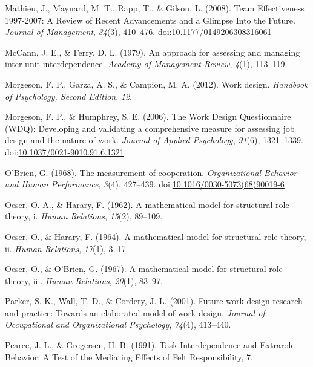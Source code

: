 \documentclass[english,,man]{apa6}
\theoremstyle{definition}
\theoremstyle{definition}
\theoremstyle{definition}
\theoremstyle{remark}
\begin{document}
\leavevmode\hypertarget{ref-mathieu_team_2008}{}%
Mathieu, J., Maynard, M. T., Rapp, T., \& Gilson, L. (2008). Team
Effectiveness 1997-2007: A Review of Recent Advancements and a Glimpse
Into the Future. \emph{Journal of Management}, \emph{34}(3), 410--476.
doi:\href{https://doi.org/10.1177/0149206308316061}{10.1177/0149206308316061}

\leavevmode\hypertarget{ref-mccann_approach_1979}{}%
McCann, J. E., \& Ferry, D. L. (1979). An approach for assessing and
managing inter-unit interdependence. \emph{Academy of Management
Review}, \emph{4}(1), 113--119.

\leavevmode\hypertarget{ref-morgeson2012work}{}%
Morgeson, F. P., Garza, A. S., \& Campion, M. A. (2012). Work design.
\emph{Handbook of Psychology, Second Edition}, \emph{12}.

\leavevmode\hypertarget{ref-morgeson_work_2006}{}%
Morgeson, F. P., \& Humphrey, S. E. (2006). The Work Design
Questionnaire (WDQ): Developing and validating a comprehensive measure
for assessing job design and the nature of work. \emph{Journal of
Applied Psychology}, \emph{91}(6), 1321--1339.
doi:\href{https://doi.org/10.1037/0021-9010.91.6.1321}{10.1037/0021-9010.91.6.1321}

\leavevmode\hypertarget{ref-obrien_measurement_1968}{}%
O'Brien, G. (1968). The measurement of cooperation. \emph{Organizational
Behavior and Human Performance}, \emph{3}(4), 427--439.
doi:\href{https://doi.org/10.1016/0030-5073(68)90019-6}{10.1016/0030-5073(68)90019-6}

\leavevmode\hypertarget{ref-oeser1962mathematical}{}%
Oeser, O. A., \& Harary, F. (1962). A mathematical model for structural
role theory, i. \emph{Human Relations}, \emph{15}(2), 89--109.

\leavevmode\hypertarget{ref-oeser1964mathematical}{}%
Oeser, O., \& Harary, F. (1964). A mathematical model for structural
role theory, ii. \emph{Human Relations}, \emph{17}(1), 3--17.

\leavevmode\hypertarget{ref-oeser1967mathematical}{}%
Oeser, O., \& O'Brien, G. (1967). A mathematical model for structural
role theory, iii. \emph{Human Relations}, \emph{20}(1), 83--97.

\leavevmode\hypertarget{ref-parker_future_2001}{}%
Parker, S. K., Wall, T. D., \& Cordery, J. L. (2001). Future work design
research and practice: Towards an elaborated model of work design.
\emph{Journal of Occupational and Organizational Psychology},
\emph{74}(4), 413--440.

\leavevmode\hypertarget{ref-pearce_task_nodate}{}%
Pearce, J. L., \& Gregersen, H. B. (1991). Task Interdependence and
Extrarole Behavior: A Test of the Mediating Effects of Felt
Responsibility, 7.
\end{document}
